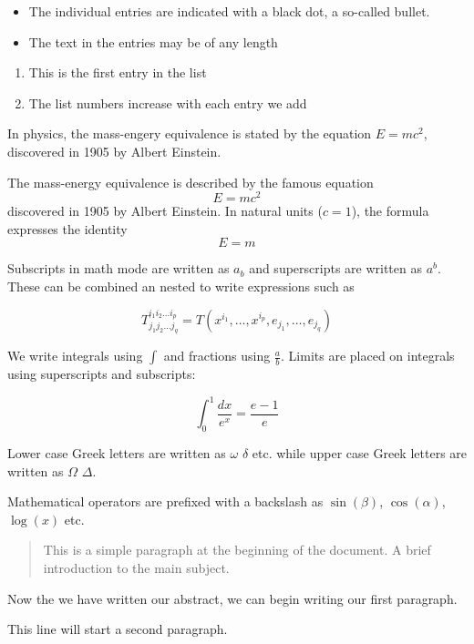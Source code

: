 \documentclass[11pt]{article}
\begin{document}
\begin{itemize}
    \item The individual entries are indicated with a black dot, a so-called bullet.
    \item The text in the entries may be of any length
\end{itemize}

\begin{enumerate}
    \item This is the first entry in the list
    \item The list numbers increase with each entry we add
\end{enumerate}

In physics, the mass-engery equivalence is stated by the equation
$E=mc^2$, discovered in 1905 by Albert Einstein.

The mass-energy equivalence is described by the famous equation
\[ E=mc^2 \]
discovered in 1905 by Albert Einstein.
In natural units ($c = 1$), the formula expresses the identity
\begin{equation}
    E=m
\end{equation}

Subscripts in math mode are written as $a_b$ and superscripts are written as $a^b$. These can be combined an nested to write expressions such as

\[ T^{i_1 i_2 \dots i_p}_{j_1 j_2 \dots j_q} = T(x^{i_1},\dots,x^{i_p},e_{j_1},\dots,e_{j_q}) \]
 
We write integrals using $\int$ and fractions using $\frac{a}{b}$. Limits are placed on integrals using superscripts and subscripts:

\[ \int_0^1 \frac{dx}{e^x} =  \frac{e-1}{e} \]

Lower case Greek letters are written as $\omega$ $\delta$ etc. while upper case Greek letters are written as $\Omega$ $\Delta$.

Mathematical operators are prefixed with a backslash as $\sin(\beta)$, $\cos(\alpha)$, $\log(x)$ etc.

\begin{abstract}
    This is a simple paragraph at the beginning of the document.
    A brief introduction to the main subject.
\end{abstract}

Now the we have written our abstract, we can begin writing our first paragraph.

This line will start a second paragraph.

\end{document}
